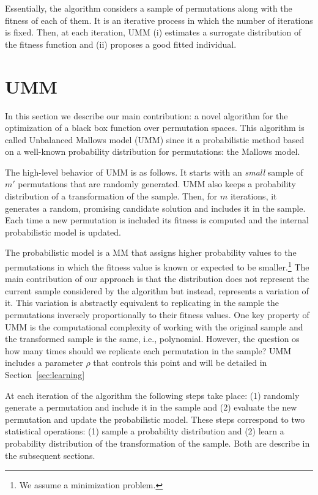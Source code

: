 \documentclass[runningheads]{llncs}
\begin{document}
Essentially, the algorithm  considers a sample of permutations along with the fitness of each of them. It is an iterative process in which the number of iterations is fixed. 
Then, at each iteration, UMM (i) estimates a surrogate distribution of the fitness function and (ii) proposes a good fitted individual. 


\section{UMM }
In this section we describe our main contribution: a novel algorithm for the optimization of a black box function over permutation spaces. This algorithm is called Unbalanced Mallows model (UMM) since it a probabilistic method based on a well-known probability distribution for permutations: the Mallows model. 


The high-level behavior of UMM is as follows. It starts with an \textit{small} sample of $m'$ permutations that are randomly generated. UMM also keeps a probability distribution of a transformation of the sample. Then, for $m$ iterations, it generates a random, promising candidate solution and includes it in the sample. Each time a new permutation is included its fitness is computed and the internal probabilistic model is updated. 

The probabilistic model is a MM that assigns higher probability values to the permutations in which the fitness value is known or expected to be smaller.\footnote{We assume a minimization problem.} The main contribution of our approach is that the distribution does not represent the current sample considered by the algorithm but instead, represents a variation of it. This variation is abstractly equivalent to replicating in the sample the permutations inversely proportionally to their fitness values. One key property of UMM is the computational complexity of working with the original sample and the transformed sample is the same, i.e., polynomial. However, the question os how many times should we replicate each permutation in the sample? UMM includes a parameter $\rho$ that controls this point and will be detailed in Section~\ref{sec:learning}

At each iteration of the algorithm the following steps take place: (1) randomly generate a permutation and include it in the sample and (2) evaluate the new permutation and update the probabilistic model. These steps correspond to two statistical operations: (1) sample a probability distribution and (2) learn a probability distribution of the transformation of the sample. Both are describe in the subsequent sections. 
\end{document}
